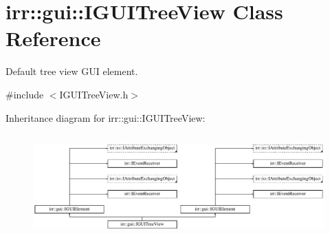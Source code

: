 \hypertarget{classirr_1_1gui_1_1IGUITreeView}{}\section{irr\+:\+:gui\+:\+:I\+G\+U\+I\+Tree\+View Class Reference}
\label{classirr_1_1gui_1_1IGUITreeView}


Default tree view G\+UI element.  




{\ttfamily \#include $<$I\+G\+U\+I\+Tree\+View.\+h$>$}

Inheritance diagram for irr\+:\+:gui\+:\+:I\+G\+U\+I\+Tree\+View\+:\begin{figure}[H]
\begin{center}
\leavevmode
\includegraphics[height=4.038462cm]{classirr_1_1gui_1_1IGUITreeView}
\end{center}
\end{figure}

